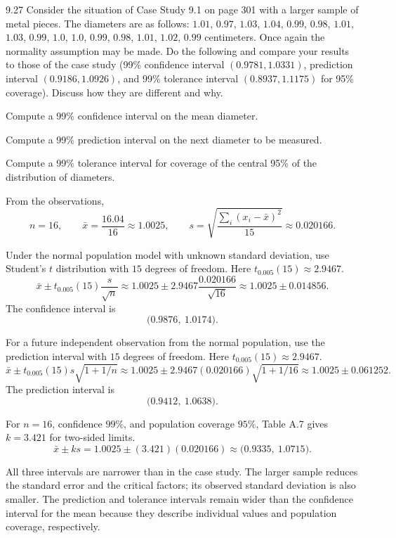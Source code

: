 \documentclass[11pt,oneside]{article}
\begin{document}
\begin{exercise}{9.27}
Consider the situation of Case Study 9.1 on page 301 with a larger sample of metal pieces. The diameters are as follows: $1.01$, $0.97$, $1.03$, $1.04$, $0.99$, $0.98$, $1.01$, $1.03$, $0.99$, $1.0$, $1.0$, $0.99$, $0.98$, $1.01$, $1.02$, $0.99$ centimeters. Once again the normality assumption may be made. Do the following and compare your results to those of the case study (99\% confidence interval $(0.9781,1.0331)$, prediction interval $(0.9186,1.0926)$, and 99\% tolerance interval $(0.8937,1.1175)$ for 95\% coverage). Discuss how they are different and why.
\begin{exercisesubparts}
\item Compute a 99\% confidence interval on the mean diameter.
\item Compute a 99\% prediction interval on the next diameter to be measured.
\item Compute a 99\% tolerance interval for coverage of the central 95\% of the distribution of diameters.
\end{exercisesubparts}
\end{exercise}
\begin{solution}
From the observations, 
\[
n=16,\qquad\bar x=\frac{16.04}{16}\approx1.0025,\qquad s=\sqrt{\frac{\sum_i(x_i-\bar x)^2}{15}}\approx0.020166.
\]
\begin{exercisesubparts}
\item Under the normal population model with unknown standard deviation, use Student's $t$ distribution with $15$ degrees of freedom. Here $t_{0.005}(15)\approx 2.9467$.
\[
\bar x\pm t_{0.005}(15)\frac{s}{\sqrt n}\approx 1.0025\pm 2.9467\frac{0.020166}{\sqrt{16}}\approx 1.0025\pm 0.014856.
\]
The confidence interval is 
\[
\boxed{\bigl(0.9876,\ 1.0174\bigr)}.
\]

\item For a future independent observation from the normal population, use the prediction interval with $15$ degrees of freedom. Here $t_{0.005}(15)\approx 2.9467$.
\[
\bar x\pm t_{0.005}(15)s\sqrt{1+1/n}\approx 1.0025\pm 2.9467(0.020166)\sqrt{1+1/16}\approx 1.0025\pm 0.061252.
\]
The prediction interval is 
\[
\boxed{\bigl(0.9412,\ 1.0638\bigr)}.
\]

\item For $n=16$, confidence $99\%$, and population coverage $95\%$, Table A.7 gives $k=3.421$ for two-sided limits.
\[
\bar x\pm ks=1.0025\pm(3.421)(0.020166)\approx\boxed{\bigl(0.9335,\ 1.0715\bigr)}.
\]

\end{exercisesubparts}
All three intervals are narrower than in the case study. The larger sample reduces the standard error and the critical factors; its observed standard deviation is also smaller. The prediction and tolerance intervals remain wider than the confidence interval for the mean because they describe individual values and population coverage, respectively.
\end{solution}
\end{document}

